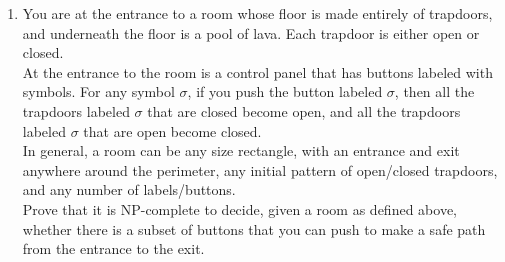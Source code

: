 \documentclass{article}
\newcommand{\newp}{\\[2mm]}
\begin{document}
\begin{enumerate}
    
\newpage
    \item You are at the entrance to a room whose floor is made entirely of trapdoors, and underneath the floor is a pool of lava. Each trapdoor is either open or closed.\newp
    At the entrance to the room is a control panel that has buttons labeled with symbols. For any symbol $\sigma$, if you push the button labeled $\sigma$, then all the trapdoors labeled $\sigma$ that are closed become open, and all the trapdoors labeled $\sigma$ that are open become closed. \newp
    In general, a room can be any size rectangle, with an entrance and exit anywhere around the perimeter, any initial pattern of open/closed trapdoors, and any number of labels/buttons.\newp
    Prove that it is NP-complete to decide, given a room as defined above, whether there is a subset of buttons that you can push to make a safe path from the entrance to the exit.\newp
    
\end{enumerate}
\end{document}

